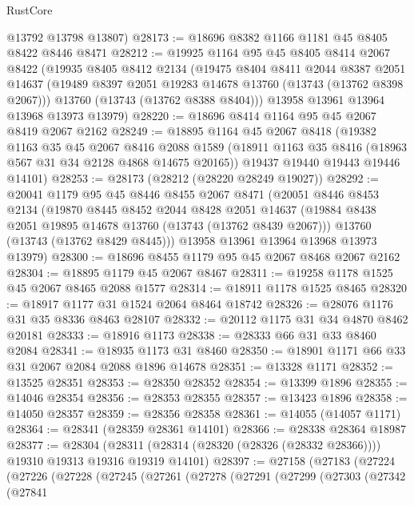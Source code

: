 \begin{lexlean}{RustCore}
\begin{coremodule}
      @13792
      @13798
      @13807)
@28173 := @18696 @8382 @1166 @1181 @45 @8405 @8422 @8446 @8471
@28212 := @19925
    @1164
    @95
    @45
    @8405
    @8414
    @2067
    @8422
    (@19935
      @8405
      @8412
      @2134
      (@19475
        @8404
        @8411
        @2044
        @8387
        @2051
        @14637
        (@19489 @8397 @2051 @19283 @14678 @13760 (@13743 (@13762 @8398 @2067)))
        @13760
        (@13743 (@13762 @8388 @8404)))
      @13958
      @13961
      @13964
      @13968
      @13973
      @13979)
@28220 := @18696 @8414 @1164 @95 @45 @2067 @8419 @2067 @2162
@28249 := @18895
    @1164
    @45
    @2067
    @8418
    (@19382
      @1163
      @35
      @45
      @2067
      @8416
      @2088
      @1589
      (@18911 @1163 @35 @8416 (@18963 @567 @31 @34 @2128 @4868 @14675 @20165))
      @19437
      @19440
      @19443
      @19446
      @14101)
@28253 := @28173 (@28212 (@28220 @28249 @19027))
@28292 := @20041
    @1179
    @95
    @45
    @8446
    @8455
    @2067
    @8471
    (@20051
      @8446
      @8453
      @2134
      (@19870
        @8445
        @8452
        @2044
        @8428
        @2051
        @14637
        (@19884 @8438 @2051 @19895 @14678 @13760 (@13743 (@13762 @8439 @2067)))
        @13760
        (@13743 (@13762 @8429 @8445)))
      @13958
      @13961
      @13964
      @13968
      @13973
      @13979)
@28300 := @18696 @8455 @1179 @95 @45 @2067 @8468 @2067 @2162
@28304 := @18895 @1179 @45 @2067 @8467
@28311 := @19258 @1178 @1525 @45 @2067 @8465 @2088 @1577
@28314 := @18911 @1178 @1525 @8465
@28320 := @18917 @1177 @31 @1524 @2064 @8464 @18742
@28326 := @28076 @1176 @31 @35 @8336 @8463 @28107
@28332 := @20112 @1175 @31 @34 @4870 @8462 @20181
@28333 := @18916 @1173
@28338 := @28333 @66 @31 @33 @8460 @2084
@28341 := @18935 @1173 @31 @8460
@28350 := @18901 @1171 @66 @33 @31 @2067 @2084 @2088 @1896 @14678
@28351 := @13328 @1171
@28352 := @13525 @28351
@28353 := @28350 @28352
@28354 := @13399 @1896
@28355 := @14046 @28354
@28356 := @28353 @28355
@28357 := @13423 @1896
@28358 := @14050 @28357
@28359 := @28356 @28358
@28361 := @14055 (@14057 @1171)
@28364 := @28341 (@28359 @28361 @14101)
@28366 := @28338 @28364 @18987
@28377 := @28304
    (@28311 (@28314 (@28320 (@28326 (@28332 @28366)))) @19310 @19313 @19316 @19319 @14101)
@28397 := @27158
    (@27183
      (@27224
        (@27226
          (@27228
            (@27245
              (@27261
                (@27278
                  (@27291
                    (@27299
                      (@27303
                        (@27342
                          (@27841

\end{coremodule}
\end{lexlean}
